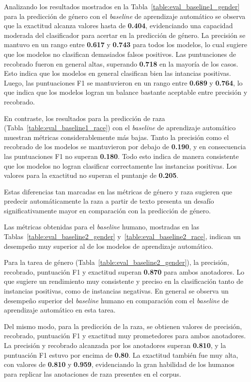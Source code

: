 Analizando los resultados mostrados en la Tabla~\ref{table:eval_baseline1_gender} para la predicci\'on de g\'enero con el 
\emph{baseline} de aprendizaje autom\'atico se observa que la exactitud alcanza valores hasta de \textbf{0.404}, 
evidenciando una capacidad moderada del clasificador para acertar en la predicci\'on de g\'enero. La precisi\'on se 
mantuvo en un rango entre \textbf{0.617} y \textbf{0.743} para todos los modelos, lo cual sugiere que los modelos no
clasifican demasiados falsos positivos. Las puntuaciones de recobrado fueron en general altas, superando \textbf{0.718}
en la mayor\'ia de los casos. Esto indica que los modelos en general clasifican bien las intancias positivas. Luego, las 
puntuaciones F1 se mantuvieron en un rango entre \textbf{0.689} y \textbf{0.764}, lo que indica que los modelos logran
un balance bastante aceptable entre precisi\'on y recobrado.

En contraste, los resultados para la predicci\'on de raza (Tabla~\ref{table:eval_baseline1_race}) con el 
\emph{baseline} de aprendizaje autom\'atico muestran m\'etricas considerablemente m\'as bajas. Tanto la 
precisi\'on como el recobrado de los modelos se mantuvieron por debajo de \textbf{0.190}, y en consecuencia 
las puntuaciones F1 no superan \textbf{0.180}. Todo esto indica de manera consistente que los modelos no 
logran clasificar correctamente las instancias positivas. Los valores para la exactitud no superan el puntanje 
de \textbf{0.205}. 

Estas diferencias tan marcadas en las m\'etricas de g\'enero y raza sugieren que predecir autom\'aticamente la 
raza a partir de texto presenta un desaf\'io significativamente mayor en comparaci\'on con la predicci\'on de 
g\'enero. 

Las m\'etricas obtenidas para el \emph{baseline} humano, mostradas en las 
Tablas~\ref{table:eval_baseline2_gender} y~\ref{table:eval_baseline2_race}, indican un desempe\~no muy 
superior al de los modelos de aprendizaje autom\'atico. 

Para la tarea de g\'enero (Tabla~\ref{table:eval_baseline2_gender}), la precisi\'on, recobrado, 
puntuaci\'on F1 y exactitud superan \textbf{0.870} para ambos anotadores. Lo que sugiere un 
rendimiento muy consistente y preciso en la clasificaci\'on tanto de instancias positivas, 
como de instancias negativas. En general se observa un desempe\~no superior del 
\emph{baseline} humano en comparaci\'on com el \emph{baseline} de aprendizaje autom\'atico en 
esta tarea.

Del mismo modo, para la predicci\'on de la raza, se obtienen valores de precisi\'on, recobrado,
puntuaci\'on F1 y exactitud muy prometedores para ambos anotadores. La precisi\'on y 
recobrado alcanzada por los anotadores superan \textbf{0.810}, y la puntuaci\'on F1 estuvo 
por encima de \textbf{0.80}. La exactitud tambi\'en fue muy alta, con valores de \textbf{0.810}
y \textbf{0.959}, evidenciando la gran habilidad de los humanos para replicar las anotaciones
de raza presentes en el corpus.

